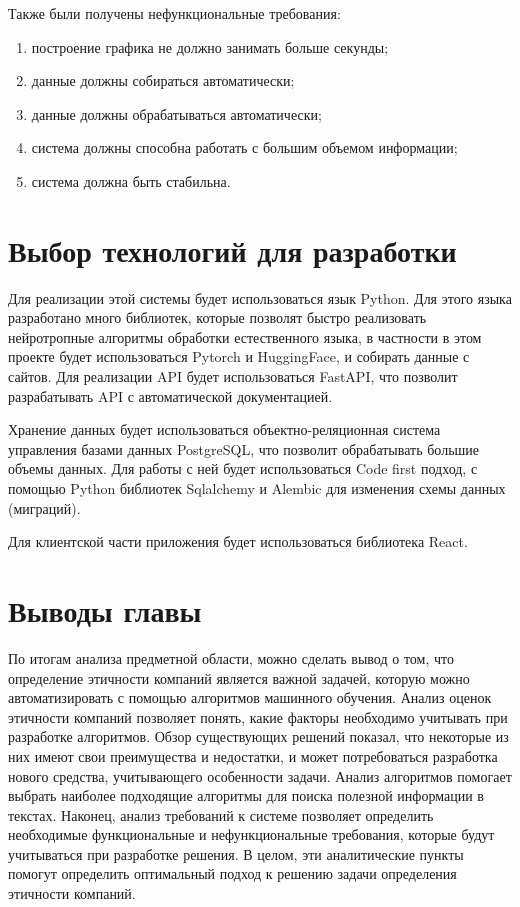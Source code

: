 \documentclass[PI, VKR]{HSEUniversity}
\begin{document}
Также были получены нефункциональные требования:
\begin{enumerate}
\item построение графика не должно занимать больше секунды;
\item данные должны собираться автоматически;
\item данные должны обрабатываться автоматически;
\item система должны способна работать с большим объемом информации;
\item система должна быть стабильна.
\end{enumerate}
\section{Выбор технологий для разработки}
\label{sec:orgc2d7a89}
Для реализации этой системы будет использоваться язык Python. Для этого языка разработано много библиотек, которые позволят быстро реализовать нейротропные алгоритмы обработки естественного языка, в частности в этом проекте будет использоваться Pytorch\autocite{paszke_pytorch_2019} и HuggingFace\autocite{wolf_transformers_2020}, и собирать данные с сайтов. Для реализации API будет использоваться FastAPI, что позволит разрабатывать API с автоматической документацией.

Хранение данных будет использоваться объектно-реляционная система управления базами данных PostgreSQL, что позволит обрабатывать большие объемы данных. Для работы с ней будет использоваться Code first подход, с помощью Python библиотек Sqlalchemy и Alembic для изменения схемы данных (миграций).

Для клиентской части приложения будет использоваться библиотека React.
\section{Выводы главы}
\label{sec:orgcecc4e9}
По итогам анализа предметной области, можно сделать вывод о том, что определение этичности компаний является важной задачей, которую можно автоматизировать с помощью алгоритмов машинного обучения. Анализ оценок этичности компаний позволяет понять, какие факторы необходимо учитывать при разработке алгоритмов. Обзор существующих решений показал, что некоторые из них имеют свои преимущества и недостатки, и может потребоваться разработка нового средства, учитывающего особенности задачи. Анализ алгоритмов помогает выбрать наиболее подходящие алгоритмы для поиска полезной информации в текстах. Наконец, анализ требований к системе позволяет определить необходимые функциональные и нефункциональные требования, которые будут учитываться при разработке решения. В целом, эти аналитические пункты помогут определить оптимальный подход к решению задачи определения этичности компаний.
\end{document}
